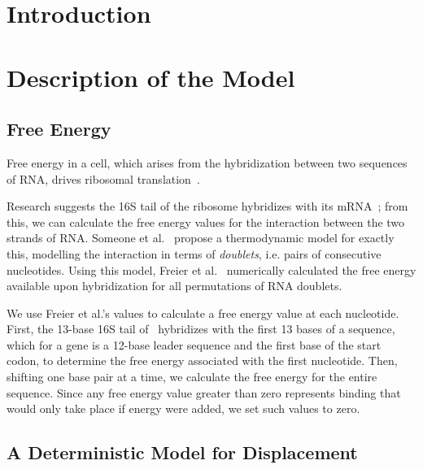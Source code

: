 \documentclass[12pt]{article}
\begin{document}

\section{Introduction}

\section{Description of the Model}

\subsection{Free Energy}
\label{freeenergy}


Free energy in a cell, which arises from the hybridization between two
sequences of RNA, drives ribosomal translation~\cite{starmer}.

Research suggests the 16S tail of the ribosome hybridizes with its  mRNA~\cite{weiss};
from this, we can  calculate the free energy values for the interaction between the two strands of RNA.
Someone et al.~\cite{freier} propose a thermodynamic model for exactly this,
modelling the interaction in terms of \emph{doublets}, i.e. pairs of consecutive nucleotides.
Using this model, Freier et al.~\cite{freier} numerically calculated the free energy available
upon hybridization for all permutations of RNA doublets.

We use Freier et al.'s values to calculate a free energy value at each nucleotide.
First, the 13-base 16S tail of \ecoli\ hybridizes with the first 13 bases of a sequence, which
for a gene is a 12-base leader sequence and the first base of the start codon, to determine
the free energy associated with the first nucleotide.
Then, shifting one base pair at a time, we calculate the free energy for the entire sequence.
Since any free energy value greater than zero represents binding that would only take place if energy were added,
we set such values to zero.


\subsection{A Deterministic Model for Displacement}
\end{document}
